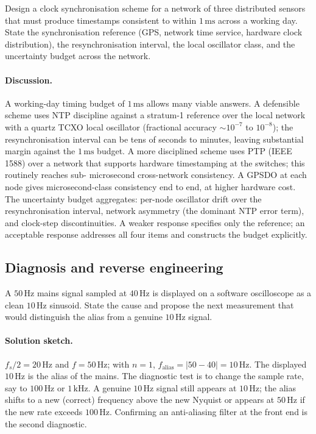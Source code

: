 \begin{exercise}
Design a clock synchronisation scheme for a network of three
distributed sensors that must produce timestamps consistent to
within $1 \,\si{\milli\second}$ across a working day. State the
synchronisation reference (GPS, network time service, hardware
clock distribution), the resynchronisation interval, the local
oscillator class, and the uncertainty budget across the network.

\paragraph{Discussion.}
A working-day timing budget of $1 \,\si{\milli\second}$ allows
many viable answers. A defensible scheme uses NTP discipline
against a stratum-1 reference over the local network with a
quartz TCXO local oscillator (fractional accuracy $\sim 10^{-7}$
to $10^{-8}$); the resynchronisation interval can be tens of
seconds to minutes, leaving substantial margin against the $1 \,
\si{\milli\second}$ budget. A more disciplined scheme uses
PTP (IEEE 1588) over a network that supports hardware
timestamping at the switches; this routinely reaches sub-
microsecond cross-network consistency. A GPSDO at each node
gives microsecond-class consistency end to end, at higher
hardware cost. The uncertainty budget aggregates: per-node
oscillator drift over the resynchronisation interval, network
asymmetry (the dominant NTP error term), and clock-step
discontinuities. A weaker response specifies only the reference;
an acceptable response addresses all four items and constructs
the budget explicitly.
\end{exercise}

\subsection*{Diagnosis and reverse engineering}

\begin{exercise}
A $50 \,\si{\hertz}$ mains signal sampled at $40 \,\si{\hertz}$ is
displayed on a software oscilloscope as a clean $10 \,\si{\hertz}$
sinusoid. State the cause and propose the next measurement that
would distinguish the alias from a genuine $10 \,\si{\hertz}$
signal.

\paragraph{Solution sketch.}
$f_{s}/2 = 20 \,\si{\hertz}$ and $f = 50 \,\si{\hertz}$; with $n
= 1$, $f_{\text{alias}} = |50 - 40| = 10 \,\si{\hertz}$. The
displayed $10 \,\si{\hertz}$ is the alias of the mains. The
diagnostic test is to change the sample rate, say to $100 \,\si
{\hertz}$ or $1 \,\si{\kilo\hertz}$. A genuine $10 \,\si{\hertz}$
signal still appears at $10 \,\si{\hertz}$; the alias shifts to a
new (correct) frequency above the new Nyquist or appears at $50
\,\si{\hertz}$ if the new rate exceeds $100 \,\si{\hertz}$.
Confirming an anti-aliasing filter at the front end is the second
diagnostic.
\end{exercise}

